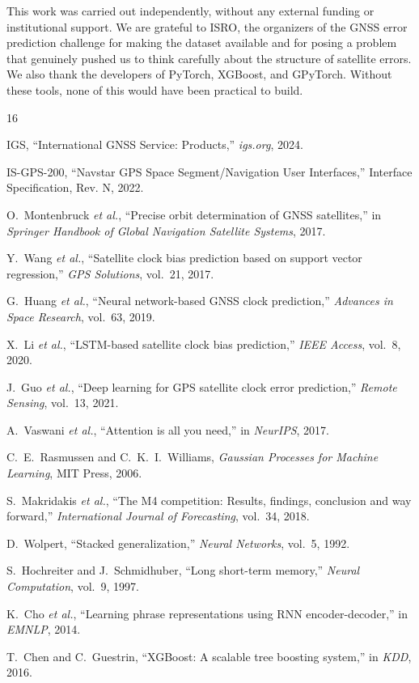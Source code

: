 \documentclass[conference]{IEEEtran}
\begin{document}
This work was carried out independently, without any external funding or institutional support. We are grateful to ISRO, the organizers of the GNSS error prediction challenge for making the dataset available and for posing a problem that genuinely pushed us to think carefully about the structure of satellite errors. We also thank the developers of PyTorch, XGBoost, and GPyTorch. Without these tools, none of this would have been practical to build.

\begin{thebibliography}{16}

IGS, ``International GNSS Service: Products,'' \textit{igs.org}, 2024.

IS-GPS-200, ``Navstar GPS Space Segment/Navigation User Interfaces,'' Interface Specification, Rev. N, 2022.

O.~Montenbruck \textit{et al.}, ``Precise orbit determination of GNSS satellites,'' in \textit{Springer Handbook of Global Navigation Satellite Systems}, 2017.

Y.~Wang \textit{et al.}, ``Satellite clock bias prediction based on support vector regression,'' \textit{GPS Solutions}, vol.~21, 2017.

G.~Huang \textit{et al.}, ``Neural network-based GNSS clock prediction,'' \textit{Advances in Space Research}, vol.~63, 2019.

X.~Li \textit{et al.}, ``LSTM-based satellite clock bias prediction,'' \textit{IEEE Access}, vol.~8, 2020.

J.~Guo \textit{et al.}, ``Deep learning for GPS satellite clock error prediction,'' \textit{Remote Sensing}, vol.~13, 2021.

A.~Vaswani \textit{et al.}, ``Attention is all you need,'' in \textit{NeurIPS}, 2017.

C.~E.~Rasmussen and C.~K.~I.~Williams, \textit{Gaussian Processes for Machine Learning}, MIT Press, 2006.

S.~Makridakis \textit{et al.}, ``The M4 competition: Results, findings, conclusion and way forward,'' \textit{International Journal of Forecasting}, vol.~34, 2018.

D.~Wolpert, ``Stacked generalization,'' \textit{Neural Networks}, vol.~5, 1992.

S.~Hochreiter and J.~Schmidhuber, ``Long short-term memory,'' \textit{Neural Computation}, vol.~9, 1997.

K.~Cho \textit{et al.}, ``Learning phrase representations using RNN encoder-decoder,'' in \textit{EMNLP}, 2014.

T.~Chen and C.~Guestrin, ``XGBoost: A scalable tree boosting system,'' in \textit{KDD}, 2016.

\end{thebibliography}

\vspace{12pt}
\end{document}
